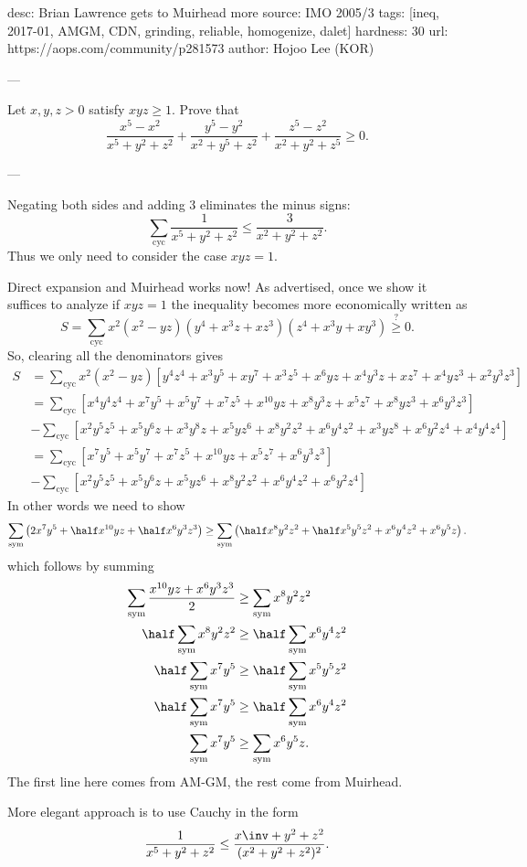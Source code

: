 desc: Brian Lawrence gets to Muirhead more
source: IMO 2005/3
tags: [ineq, 2017-01, AMGM, CDN, grinding, reliable, homogenize, dalet]
hardness: 30
url: https://aops.com/community/p281573
author: Hojoo Lee (KOR)

---

Let $x,y,z > 0$ satisfy $xyz\geq 1$. Prove that
\[ \frac { x^5-x^2 }{x^5+y^2+z^2}
  + \frac {y^5-y^2}{x^2+y^5+z^2}
  + \frac {z^5-z^2}{x^2+y^2+z^5} \geq 0. \]

---

Negating both sides and adding $3$ eliminates the minus signs:
\[ \sum_{\text{cyc}} \frac{1}{x^5+y^2+z^2}
  \le \frac{3}{x^2+y^2+z^2}. \]
Thus we only need to consider the case $xyz = 1$.

Direct expansion and Muirhead works now!
As advertised, once we show it suffices to analyze if $xyz=1$
the inequality becomes more economically written as
\[ S = \sum_{\text{cyc}} x^2(x^2-yz)(y^4+x^3z+xz^3)(z^4+x^3y+xy^3)
  \overset{?}{\ge} 0. \]
So, clearing all the denominators gives
\begin{align*}
  S &= \sum_{\text{cyc}} x^2(x^2-yz)
  \left[ y^4z^4 + x^3y^5 + xy^7 + x^3z^5 + x^6yz + x^4y^3z
    + xz^7 + x^4yz^3 + x^2y^3z^3 \right] \\
  &= \sum_{\text{cyc}}
  \left[ x^4y^4z^4 + x^7y^5 + x^5y^7 + x^7z^5 + x^{10}yz + x^8y^3z
    + x^5z^7 + x^8yz^3 + x^6y^3z^3 \right] \\
  &- \sum_{\text{cyc}}
  \left[ x^2y^5z^5 + x^5y^6z + x^3y^8z + x^5yz^6 + x^8y^2z^2 + x^6y^4z^2
    + x^3yz^8 + x^6y^2z^4 + x^4y^4z^4 \right] \\
  &= \sum_{\text{cyc}}
  \left[ x^7y^5 + x^5y^7 + x^7z^5 + x^{10}yz
    + x^5z^7 + x^6y^3z^3 \right] \\
  &- \sum_{\text{cyc}}
  \left[ x^2y^5z^5 + x^5y^6z + x^5yz^6 + x^8y^2z^2 + x^6y^4z^2
    + x^6y^2z^4 \right]
\end{align*}
In other words we need to show
\[
  \sum_{\text{sym}} \left( 2x^7y^5
  +\half x^{10}yz + \half x^6y^3z^3 \right)
  \ge
  \sum_{\text{sym}} \left( \half x^8 y^2 z^2
  + \half x^5 y^5 z^2 + x^6 y^4 z^2 + x^6 y^5 z \right).
\]
which follows by summing
\begin{align*}
  \sum_{\text{sym}} \frac{x^{10} yz + x^6 y^3 z^3}{2}
    &\ge \sum_{\text{sym}} x^8 y^2 z^2 \\
  \half \sum_{\text{sym}} x^8 y^2 z^2
    &\ge \half \sum_{\text{sym}} x^6 y^4 z^2 \\
  \half \sum_{\text{sym}} x^7y^5
    &\ge \half \sum_{\text{sym}} x^5 y^5 z^2 \\
  \half \sum_{\text{sym}} x^7y^5
    &\ge \half \sum_{\text{sym}} x^6 y^4 z^2 \\
  \sum_{\text{sym}} x^7y^5
    &\ge \sum_{\text{sym}} x^6 y^5 z.
\end{align*}
The first line here comes from AM-GM,
the rest come from Muirhead.
\begin{remark*}
More elegant approach is to use Cauchy in the form
\[ \frac{1}{x^5+y^2+z^2} \le \frac{x\inv+y^2+z^2}{(x^2+y^2+z^2)^2}. \]
\end{remark*}


